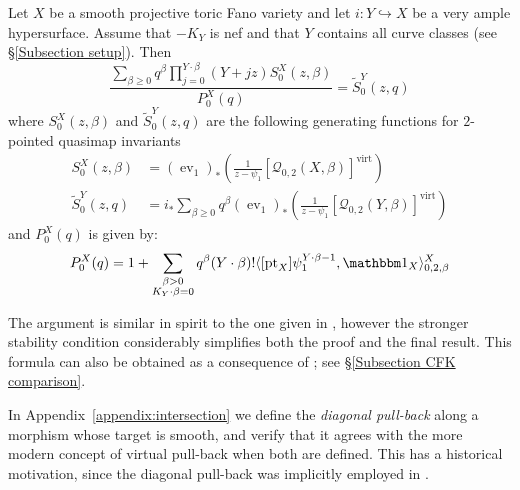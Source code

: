 \documentclass[11pt]{amsart}
\newcommand{\Q}[4]{\mathcal{Q}_{#1,#2}(#3,#4)}
\newcommand{\Gm}{\mathbb{G}_{\text{m}}}
\newcommand{\virt}[1]{[#1]^{\operatorname{virt}}}
\newcommand{\pt}{\operatorname{pt}}
\newcommand{\ev}{\operatorname{ev}}
\newcommand{\om}[1]{\mathcal{#1}}
\theoremstyle{definition}
\newenvironment{customthm}[1]
  {\renewcommand\theinnercustomthm{#1}\innercustomthm}
  {\endinnercustomthm}
\theoremstyle{definition}
\begin{document}
\begin{customthm}{\ref{Theorem Quantum Lefschetz}}
Let $X$ be a smooth projective toric Fano variety and let $i\colon Y \hookrightarrow X$ be a very ample hypersurface. Assume that $-K_Y$ is nef and that $Y$ contains all curve classes (see \S \ref{Subsection setup}). Then
\begin{equation*}
\dfrac{\sum_{\beta\geq 0} q^\beta\prod_{j=0}^{Y\cdot\beta}(Y+jz)S_0^X(z,\beta)}{P_0^X(q)}= \tilde{S}_0^Y(z,q)
\end{equation*}
where $S_0^X(z,\beta)$ and $\tilde{S}_0^Y(z,q)$ are the following generating functions for $2$-pointed quasimap invariants
\begin{align*}
S_0^X(z,\beta)&=(\ev_1)_*\left(\frac{1}{z-\psi_1} \virt{\Q{0}{2}{X}{\beta}}\right) \\
\tilde{S}_0^Y(z,q)&=i_* \sum_{\beta \geq 0} q^\beta (\ev_1)_*\left(\frac{1}{z-\psi_1} \virt{\Q{0}{2}{Y}{\beta}}\right)
\end{align*}
and $P_0^X(q)$ is given by:
\begin{equation*}
P_0^X(q) = 1 + \sum_{\substack{\beta>0 \\ K_Y\cdot\beta=0}} q^\beta(Y\cdot\beta)!\langle [\pt_X] \psi_1^{Y\cdot\beta-1} ,\mathbbm 1_{X}\rangle_{0,2,\beta}^X
\end{equation*}
\end{customthm}

The argument is similar in spirit to the one given in \cite{Ga-MF}, however the stronger stability condition considerably simplifies both the proof and the final result. This formula can also be obtained as a consequence of \cite[Corollary~5.5.1]{CF-K-wallcrossing}; see \S \ref{Subsection CFK comparison}. 

In Appendix~\ref{appendix:intersection} we define the \emph{diagonal pull-back} along a morphism whose target is smooth, and verify that it agrees with the more modern concept of virtual pull-back \cite{Manolache-Pull} when both are defined. This has a historical motivation, since the diagonal pull-back was implicitly employed in \cite{Ga}.
\end{document}
